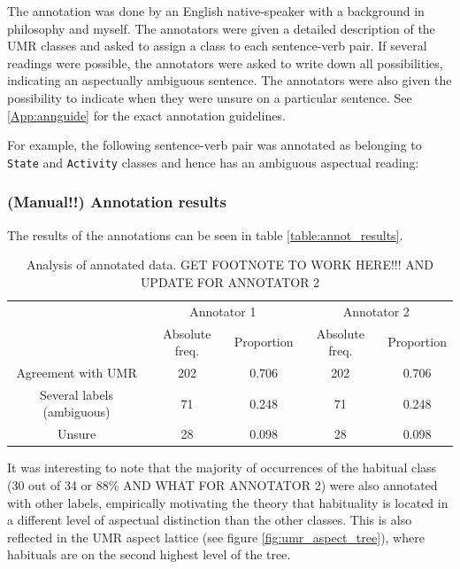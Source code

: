 The annotation was done by an English native-speaker with a background in philosophy and myself. The annotators were given a detailed description of the UMR classes and asked to assign a class to each sentence-verb pair. If several readings were possible, the annotators were asked to write down all possibilities, indicating an aspectually ambiguous sentence. The annotators were also given the possibility to indicate when they were unsure on a particular sentence. See \ref{App:annguide} for the exact annotation guidelines.

For example, the following sentence-verb pair was annotated as belonging to \texttt{State} and \texttt{Activity} classes and hence has an ambiguous aspectual reading:

\begin{exe}
\end{exe}
\label{ambigExampleSent}

\subsubsection{(Manual!!) Annotation results}

The results of the annotations can be seen in table \ref{table:annot_results}.

\begin{table}
    \begin{tabular}{|c|c|c|c|c|}\hline
        & \multicolumn{2}{|c|}{Annotator 1} & \multicolumn{2}{|c|}{Annotator 2} \\
         & Absolute freq. & Proportion & Absolute freq. & Proportion  \\ \hline
        Agreement with UMR\footnotemark & 202 & 0.706 & 202 & 0.706 \\ \hline
        Several labels (ambiguous) & 71 & 0.248 & 71 & 0.248 \\\hline
        Unsure & 28 & 0.098 & 28 & 0.098\\\hline
    \end{tabular}
    \caption{Analysis of annotated data. GET FOOTNOTE TO WORK HERE!!! AND UPDATE FOR ANNOTATOR 2}
\end{table}
\label{table:annot_results}

It was interesting to note that the majority of occurrences of the habitual class (30 out of 34 or 88\% AND WHAT FOR ANNOTATOR 2) were also annotated with other labels, empirically motivating the theory that habituality is located in a different level of aspectual distinction than the other classes. This is also reflected in the UMR aspect lattice (see figure \ref{fig:umr_aspect_tree}), where habituals are on the second highest level of the tree. 

